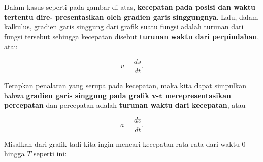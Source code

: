 \documentclass[12pt, a4paper]{article}\usepackage[utf8]{inputenc}
\theoremstyle{plain}
\theoremstyle{plain}
\numberwithin{equation}{section}
\theoremstyle{definition}
\begin{document}
\begin{figure}[htb]
	\end{figure}
	
	Dalam kasus seperti pada gambar di atas, \textbf{kecepatan pada posisi dan waktu tertentu dire- \linebreak presentasikan oleh gradien garis singgungnya}. Lalu, dalam kalkulus, gradien garis singgung dari grafik suatu fungsi adalah turunan dari fungsi tersebut sehingga kecepatan disebut \textbf{turunan waktu dari perpindahan}, atau
	
	\begin{equation}
		\displaystyle v = \frac{ds}{dt}.
	\end{equation}
	\par
	Terapkan penalaran yang serupa pada kecepatan, maka kita dapat simpulkan bahwa \textbf{gradien garis singgung pada grafik $\boldsymbol{v}$-$\boldsymbol{t}$ merepresentasikan percepatan} dan percepatan adalah \textbf{turunan waktu dari kecepatan}, atau 
	
	\begin{equation}
		a = \frac{dv}{dt}.
	\end{equation}
	
	
	Misalkan dari grafik tadi kita ingin mencari kecepatan rata-rata dari waktu $0$ hingga $T$ seperti ini:
	
\end{document}
